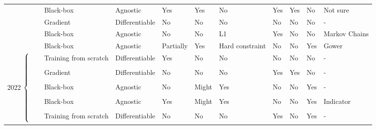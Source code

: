\begin{table*}
{\begin{tabular}{m{}m{}m{}m{}m{}m{}m{}m{}m{}m{}m{}}
    & \citep{gan_cfe_amortized} & Black-box & Agnostic & Yes & Yes & No & Yes & Yes & No & Not sure \\ %
    & \citep{Gradual_Construction} & Gradient & Differentiable & No & No & No & No & No & No & - \\ %
    & \citep{coherent_CFEs} & Black-box & Agnostic & No & No & L1 & Yes & No & No & Markov Chains \\ %
    & \citep{monte-carlo-cfe-technique} & Black-box & Agnostic & Partially & Yes & Hard constraint & No & No & Yes & Gower \\ %
    \multirow{5}{*}{2022 $\begin{dcases*} \\ \\ \\ \\ \\ \\ \\ \end{dcases*}$} & \citep{guo-cfe-counternet} & Training from scratch & Differentiable & Yes & No & No & No & No & No & - \\ %
    & \citep{Xiang2022-Realistic-VAE-CFE} & Gradient & Differentiable & No & No & No & Yes & Yes & No & - \\ %
    & \citep{user-specific-cost} & Black-box & Agnostic & No & Might & Yes & No & No & Yes & - \\ %
    & \citep{hima-beyond-recourse-globalcfe} & Black-box & Agnostic & Yes & Might & Yes & No & No & Yes & Indicator \\ %
    & \citep{sum-product-networks-cfe} & Training from scratch & Differentiable & No & No & No & Yes & No & Yes & - \\  %
     \bottomrule
     \end{tabular}
     }
    
    \end{table*}
    